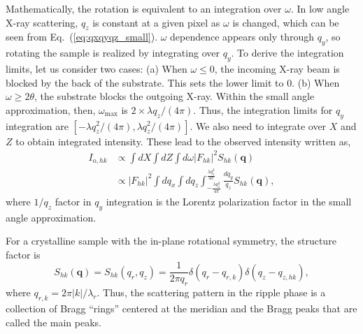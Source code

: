 \documentclass[12pt,letterpaper]{article}
\begin{document}
Mathematically, the rotation is  
equivalent to an integration over $\omega$. In low angle X-ray scattering, 
$q_z$ is constant at a given pixel as $\omega$ is changed, which can be seen from 
Eq.~(\ref{eq:qxqyqz_small}). $\omega$ dependence appears only through $q_y$, 
so rotating the sample is realized by integrating over $q_y$. 
To derive the integration limits, let us consider two cases: (a) When $\omega \leq 0$,
the incoming X-ray beam is blocked by the back of the substrate. This sets 
the lower limit to 0. (b) When $\omega \geq 2\theta$, the substrate blocks 
the outgoing X-ray. Within the small angle approximation, then, $\omega_{\text{max}}$
is $2\times \lambda q_z/(4\pi)$. Thus, the integration limits 
for $q_y$ integration are $[-\lambda q_z^2/(4\pi), \lambda q_z^2/(4\pi)]$.
We also need to integrate over $X$ and $Z$ to obtain integrated intensity. 
These lead to the observed intensity
written as,
\begin{align}
  I_{\mathrm{o},hk} 
    &\propto \int dX \int dZ \int d\omega |F_{hk}|^2 S_{hk}(\mathbf{q}) \nonumber \\
    &\propto |F_{hk}|^2 \int dq_x \int dq_z 
             \int_{-\frac{\lambda q_z^2}{4\pi}}^{\frac{\lambda q_z^2}{4\pi}} \frac{dq_y}{q_z} 
             S_{hk}(\mathbf{q}),
\end{align}
where $1/q_z$ factor in $q_y$ integration is the Lorentz polarization factor
in the small angle approximation. 

For a crystalline sample with the in-plane rotational symmetry, the
structure factor is  
\begin{equation}
  S_{hk}(\mathbf{q}) = S_{hk}(q_r,q_z) 
  = \frac{1}{2\pi q_r}\delta(q_r-q_{r,k})\delta(q_z-q_{z,hk}),
\end{equation} 
where $q_{r,k}=2\pi |k|/\lambda_r$. Thus, the scattering pattern in the 
ripple phase is a 
collection of Bragg ``rings'' centered at the meridian and the 
Bragg peaks that are called the main peaks.  
\end{document}

